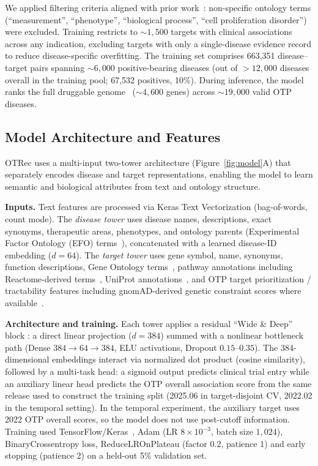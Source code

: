 \documentclass{article}
\begin{document}
We applied filtering criteria aligned with prior work~\citep{han2022}:
non-specific ontology terms (``measurement'', ``phenotype'', ``biological
process'', ``cell proliferation disorder'') were excluded.
Training restricts to ${{\sim}}1{,}500$ targets with clinical associations
across any indication, excluding targets with only a single-disease
evidence record to reduce disease-specific overfitting.
The training set comprises 663{,}351 disease--target pairs spanning
${\sim}6{,}000$ positive-bearing diseases (out of ${>}12{,}000$
diseases overall in the training pool; 67{,}532 positives, 10\%).
During inference, the model ranks the full druggable
genome~\citep{finan2017} (${\sim}4{,}600$ genes) across
${\sim}19{,}000$ valid OTP diseases.

\subsection{Model Architecture and Features}

OTRec uses a multi-input two-tower architecture (Figure~\ref{fig:model}A)
that separately encodes disease and target representations, enabling the
model to learn semantic and biological attributes from text and
ontology structure.

\textbf{Inputs.}
Text features are processed via Keras \citep{chollet2015} Text Vectorization (bag-of-words, count
mode).
The \emph{disease tower} uses disease names, descriptions, exact synonyms,
therapeutic areas, phenotypes, and ontology parents (Experimental Factor Ontology (EFO) terms~\citep{malone2010efo}),
concatenated with a learned disease-ID embedding ($d{=}64$).
The \emph{target tower} uses gene symbol, name, synonyms, function
descriptions, Gene Ontology terms~\citep{geneontology2023}, pathway
annotations including Reactome-derived terms~\citep{milacic2024reactome},
UniProt annotations~\citep{uniprot2025}, and OTP target
prioritization / tractability features including gnomAD-derived genetic
constraint scores where available~\citep{opentargetsdownloads,karczewski2020gnomad}.

\textbf{Architecture and training.}
Each tower applies a residual ``Wide \& Deep'' block \citep{cheng_wide_2016}: a direct linear
projection ($d{=}384$) summed with a nonlinear bottleneck path
(Dense $384{\to}64{\to}384$, ELU activations, Dropout $0.15$--$0.35$).
The 384-dimensional embeddings interact via normalized dot product
(cosine similarity), followed by a multi-task head: a sigmoid output
predicts clinical trial entry while an auxiliary linear head predicts
the OTP overall association score from the same release used to
construct the training split (2025.06 in target-disjoint CV, 2022.02
in the temporal setting).
In the temporal experiment, the auxiliary target uses 2022 OTP overall scores, so the model does not use post-cutoff information.
Training used TensorFlow/Keras~\citep{chollet2015, abadi_tensorflow_2016}, Adam (LR $8{\times}10^{-3}$, batch size $1{,}024$), BinaryCrossentropy loss, ReduceLROnPlateau (factor 0.2, patience 1) and early stopping (patience 2) on a held-out 5\% validation set.
\end{document}
